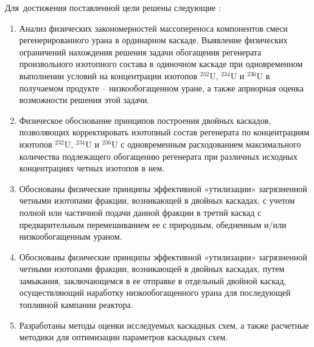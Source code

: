 Для~достижения поставленной цели решены следующие {\tasks}:
\begin{enumerate}
  \item Анализ физических закономерностей массопереноса компонентов смеси
  регенерированного урана в ординарном каскаде.
  Выявление физических ограничений нахождения решения задачи обогащения регенерата произвольного изотопного
  состава в одиночном каскаде при одновременном выполнении условий на
  концентрации изотопов $^{232}$U, $^{234}$U и $^{236}$U в получаемом продукте – низкообогащенном уране, а также априорная оценка возможности решения этой задачи.
  \item Физическое обоснование принципов построения двойных каскадов,
  позволяющих корректировать изотопный состав регенерата по концентрациям
  изотопов $^{232}$U, $^{234}$U и $^{236}$U с одновременным расходованием максимального количества
  подлежащего обогащению регенерата при различных исходных концентрациях
  четных изотопов в нем.
  \item Обоснованы физические принципы эффективной «утилизации» загрязненной четными
  изотопами фракции, возникающей в двойных каскадах, с учетом полной или
  частичной подачи данной фракции в третий каскад с предварительным
  перемешиванием ее с природным, обедненным и/или низкообогащенным ураном.
  \item Обоснованы физические принципы эффективной «утилизации» загрязненной четными
  изотопами фракции, возникающей в двойных каскадах, путем замыкания, заключающемся в ее отправке в отдельный двойной каскад, осуществляющий наработку низкообогащенного урана для последующей топливной кампании реактора.
  \item Разработаны методы оценки исследуемых каскадных схем, а также расчетные методики для оптимизации параметров каскадных схем.
\end{enumerate}



